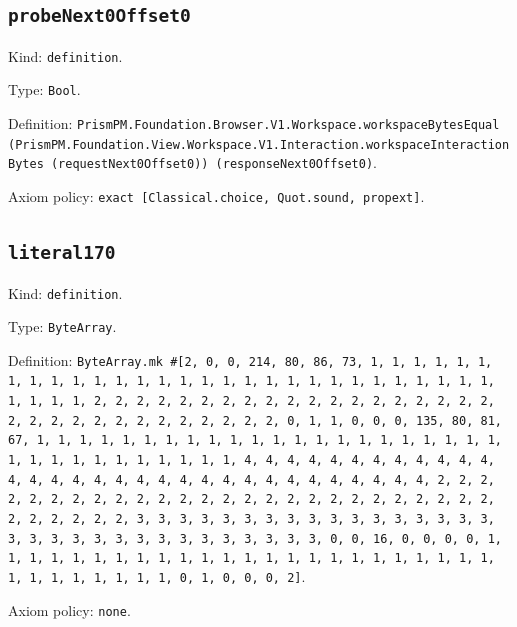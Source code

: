 \documentclass[11pt]{article}
\begin{document}
\subsection*{\texttt{probeNext0Offset0}}
\noindent Kind: \texttt{definition}.\par
\noindent Type: \texttt{Bool}.\par
\noindent Definition: \texttt{PrismPM.Foundation.Browser.V1.Workspace.workspaceBytesEqual (PrismPM.Foundation.View.Workspace.V1.Interaction.workspaceInteractionBytes (requestNext0Offset0)) (responseNext0Offset0)}.\par
\noindent Axiom policy: \texttt{exact [Classical.choice, Quot.sound, propext]}.\par
\subsection*{\texttt{literal170}}
\noindent Kind: \texttt{definition}.\par
\noindent Type: \texttt{ByteArray}.\par
\noindent Definition: \texttt{ByteArray.mk \#[2, 0, 0, 214, 80, 86, 73, 1, 1, 1, 1, 1, 1, 1, 1, 1, 1, 1, 1, 1, 1, 1, 1, 1, 1, 1, 1, 1, 1, 1, 1, 1, 1, 1, 1, 1, 1, 1, 1, 1, 2, 2, 2, 2, 2, 2, 2, 2, 2, 2, 2, 2, 2, 2, 2, 2, 2, 2, 2, 2, 2, 2, 2, 2, 2, 2, 2, 2, 2, 2, 2, 2, 0, 1, 1, 0, 0, 0, 135, 80, 81, 67, 1, 1, 1, 1, 1, 1, 1, 1, 1, 1, 1, 1, 1, 1, 1, 1, 1, 1, 1, 1, 1, 1, 1, 1, 1, 1, 1, 1, 1, 1, 1, 1, 1, 4, 4, 4, 4, 4, 4, 4, 4, 4, 4, 4, 4, 4, 4, 4, 4, 4, 4, 4, 4, 4, 4, 4, 4, 4, 4, 4, 4, 4, 4, 4, 4, 2, 2, 2, 2, 2, 2, 2, 2, 2, 2, 2, 2, 2, 2, 2, 2, 2, 2, 2, 2, 2, 2, 2, 2, 2, 2, 2, 2, 2, 2, 2, 2, 3, 3, 3, 3, 3, 3, 3, 3, 3, 3, 3, 3, 3, 3, 3, 3, 3, 3, 3, 3, 3, 3, 3, 3, 3, 3, 3, 3, 3, 3, 3, 3, 0, 0, 16, 0, 0, 0, 0, 1, 1, 1, 1, 1, 1, 1, 1, 1, 1, 1, 1, 1, 1, 1, 1, 1, 1, 1, 1, 1, 1, 1, 1, 1, 1, 1, 1, 1, 1, 1, 1, 0, 1, 0, 0, 0, 2]}.\par
\noindent Axiom policy: \texttt{none}.\par
\end{document}
